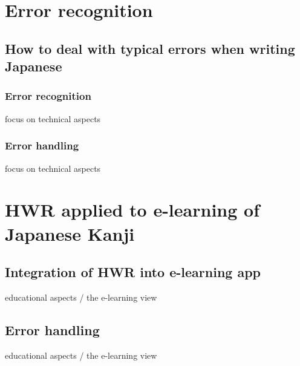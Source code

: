 \section{Error recognition}
\subsection{How to deal with typical errors when writing Japanese}
\subsubsection{Error recognition}
focus on technical aspects
\subsubsection{Error handling}
focus on technical aspects

\section{HWR applied to e-learning of Japanese Kanji}
\subsection{Integration of HWR into e-learning app}
educational aspects / the e-learning view
\subsection{Error handling}
educational aspects / the e-learning view
